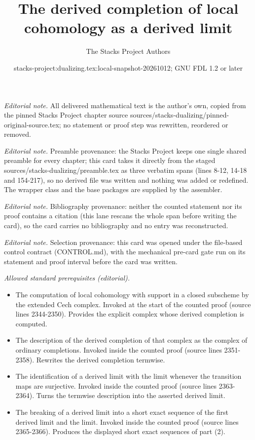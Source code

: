 \documentclass[10pt,a4paper]{amsart}
\title{The derived completion of local cohomology as a derived limit}
\author{The Stacks Project Authors}
\date{stacks-project:dualizing.tex:local-snapshot-20261012; GNU FDL 1.2 or later}
\theoremstyle{plain}
\theoremstyle{definition}
\theoremstyle{remark}
\numberwithin{equation}{subsection}
\begin{document}
\maketitle
\noindent\textit{Editorial note.} All delivered mathematical text is the author's own, copied from the pinned Stacks Project chapter source sources/stacks-dualizing/pinned-original-source.tex; no statement or proof step was rewritten, reordered or removed.\par\medskip
\noindent\textit{Editorial note.} Preamble provenance: the Stacks Project keeps one single shared preamble for every chapter; this card takes it directly from the staged sources/stacks-dualizing/preamble.tex as three verbatim spans (lines 8-12, 14-18 and 154-217), so no derived file was written and nothing was added or redefined. The wrapper class and the base packages are supplied by the assembler.\par\medskip
\noindent\textit{Editorial note.} Bibliography provenance: neither the counted statement nor its proof contains a citation (this lane rescans the whole span before writing the card), so the card carries no bibliography and no entry was reconstructed.\par\medskip
\noindent\textit{Editorial note.} Selection provenance: this card was opened under the file-based control contract (CONTROL.md), with the mechanical pre-card gate run on its statement and proof interval before the card was written.\par\medskip
\noindent\textit{Allowed standard prerequisites (editorial).}\begin{itemize}
\item The computation of local cohomology with support in a closed subscheme by the extended Cech complex. Invoked at the start of the counted proof (source lines 2344-2350). Provides the explicit complex whose derived completion is computed.
\item The description of the derived completion of that complex as the complex of ordinary completions. Invoked inside the counted proof (source lines 2351-2358). Rewrites the derived completion termwise.
\item The identification of a derived limit with the limit whenever the transition maps are surjective. Invoked inside the counted proof (source lines 2363-2364). Turns the termwise description into the asserted derived limit.
\item The breaking of a derived limit into a short exact sequence of the first derived limit and the limit. Invoked inside the counted proof (source lines 2365-2366). Produces the displayed short exact sequences of part (2).
\end{itemize}\medskip
\end{document}
